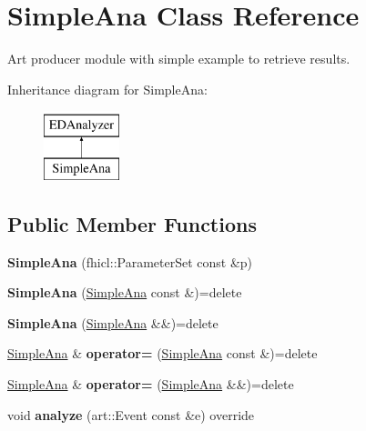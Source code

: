 \hypertarget{classSimpleAna}{\section{Simple\-Ana Class Reference}
\label{classSimpleAna}
}


Art producer module with simple example to retrieve results.  


Inheritance diagram for Simple\-Ana\-:\begin{figure}[H]
\begin{center}
\leavevmode
\includegraphics[height=2.000000cm]{classSimpleAna}
\end{center}
\end{figure}
\subsection*{Public Member Functions}
\begin{DoxyCompactItemize}
\item 
\hypertarget{classSimpleAna_a3a77d7c369c80d023aae7b59d6227e6a}{{\bfseries Simple\-Ana} (fhicl\-::\-Parameter\-Set const \&p)}\label{classSimpleAna_a3a77d7c369c80d023aae7b59d6227e6a}

\item 
\hypertarget{classSimpleAna_a4b50330389cec2d0891f2f4513661067}{{\bfseries Simple\-Ana} (\hyperlink{classSimpleAna}{Simple\-Ana} const \&)=delete}\label{classSimpleAna_a4b50330389cec2d0891f2f4513661067}

\item 
\hypertarget{classSimpleAna_a79791024bf5000e5111b58174a5eb72f}{{\bfseries Simple\-Ana} (\hyperlink{classSimpleAna}{Simple\-Ana} \&\&)=delete}\label{classSimpleAna_a79791024bf5000e5111b58174a5eb72f}

\item 
\hypertarget{classSimpleAna_a4cf298974f343a443db71375eae286ec}{\hyperlink{classSimpleAna}{Simple\-Ana} \& {\bfseries operator=} (\hyperlink{classSimpleAna}{Simple\-Ana} const \&)=delete}\label{classSimpleAna_a4cf298974f343a443db71375eae286ec}

\item 
\hypertarget{classSimpleAna_a394c98e3c87a64948a8f2950f411aacc}{\hyperlink{classSimpleAna}{Simple\-Ana} \& {\bfseries operator=} (\hyperlink{classSimpleAna}{Simple\-Ana} \&\&)=delete}\label{classSimpleAna_a394c98e3c87a64948a8f2950f411aacc}

\item 
\hypertarget{classSimpleAna_aef71affb349332a3f5c5fdea2af747e1}{void {\bfseries analyze} (art\-::\-Event const \&e) override}\label{classSimpleAna_aef71affb349332a3f5c5fdea2af747e1}

\end{DoxyCompactItemize}


